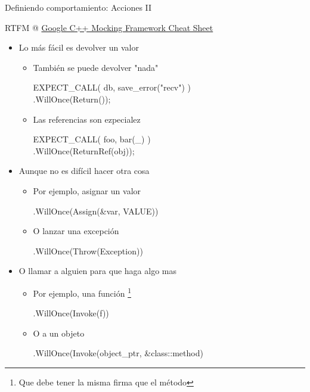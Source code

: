 \begin{frame}[t]{Definiendo comportamiento: Acciones II}
\begin{flushright}
	RTFM @ \href{http://code.google.com/p/googlemock/wiki/CheatSheet\#Actions}{Google C++ Mocking Framework Cheat Sheet}
\end{flushright}
\begin{itemize}
	\item Lo m\'as f\'acil es devolver un valor
	\only<2> {
		\begin{itemize}
		\item Tambi\'en se puede devolver "nada" \\
			\begin{center}
			EXPECT\_CALL( db, save\_error("recv") ) \\
				.WillOnce(\alert{Return()});
			\end{center}
		\item Las referencias son ezpecialez \\
			\begin{center}
			EXPECT\_CALL( foo, bar(\_) ) \\
				.WillOnce(\alert{ReturnRef(obj)});
			\end{center}
		\end{itemize}
	}
	\item Aunque no es dif\'icil hacer otra cosa
	\only<3> {
		\begin{itemize}
		\item Por ejemplo, asignar un valor
			\begin{center}.WillOnce(\alert{Assign(\&var, VALUE)})\end{center}
		\item O lanzar una excepci\'on
			\begin{center}.WillOnce(\alert{Throw(Exception)})\end{center}
		\end{itemize}
	}
	\item O llamar a alguien para que haga algo mas
	\only<4> {
		\begin{itemize}
		\item Por ejemplo, una funci\'on \footnote{Que debe tener la misma firma que el m\'etodo}
			\begin{center}.WillOnce(\alert{Invoke(f)})\end{center}
		\item O a un objeto
			\begin{center}.WillOnce(\alert{Invoke(object\_ptr, \&class::method})\end{center}

\end{itemize}}
\end{itemize}
\end{frame}
